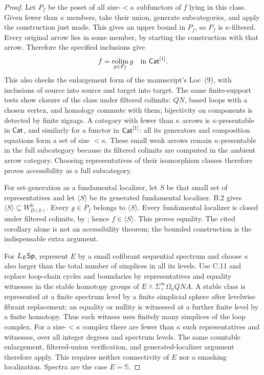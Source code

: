 \begin{proof}
Let $P_f$ be the poset of all size-$<\kappa$ subfunctors of $f$
lying in this class. Given fewer than $\kappa$ members, take their
union, generate subcategories, and apply the construction just
made. This gives an upper bound in $P_f$, so $P_f$ is
$\kappa$-filtered. Every original arrow lies in some member,
by starting the construction with that arrow. Therefore the
specified inclusions give
\[
 f=\operatorname*{colim}_{g\in P_f}g\quad\text{in }\mathsf{Cat}^{[1]}.
\]
This also checks the enlargement form of the manuscript's Loc~(9),
with inclusions of source into source and target into target.
The same finite-support tests show closure of the class under
filtered colimits: $QN$, based loops with a chosen vertex, and
homology commute with them; bijectivity on components is detected
by finite zigzags. A category with fewer than $\kappa$ arrows is
$\kappa$-presentable in $\mathsf{Cat}$, and similarly for a functor in
$\mathsf{Cat}^{[1]}$: all its generators and composition equations form
a set of size $<\kappa$. These small weak arrows remain
$\kappa$-presentable in the full subcategory because its filtered
colimits are computed in the ambient arrow category. Choosing
representatives of their isomorphism classes therefore proves
accessibility as a full subcategory.

For set-generation as a fundamental localizer, let $S$ be that
small set of representatives and let $\langle S\rangle$ be its
generated fundamental localizer. B.2 gives
$\langle S\rangle\subseteq W_{D(k)}^{\mathrm{lc}}$.
Every $g\in P_f$ belongs to $\langle S\rangle$. Every
fundamental localizer is closed under filtered colimits, by
\citet[Corollary~4.2.22]{Cisinski2006}; hence
$f\in\langle S\rangle$. This proves equality. The cited
corollary alone is not an accessibility theorem; the bounded
construction is the indispensable extra argument.

For $L_E\mathsf{Sp}$, represent $E$ by a small cofibrant sequential
spectrum and choose $\kappa$ also larger than the total number
of simplices in all its levels. Use C.11 and replace loop-chain
cycles and boundaries by representatives and equality witnesses
in the stable homotopy groups of
$E\wedge\Sigma^\infty_+\Omega_aQN A$. A stable class is
represented at a finite spectrum level by a finite simplicial
sphere after levelwise fibrant replacement; an equality or
nullity is witnessed at a further finite level by a finite
homotopy. Thus each witness uses finitely many simplices of
the loop complex. For a size-$<\kappa$ complex there are fewer
than $\kappa$ such representatives and witnesses, over all
integer degrees and spectrum levels. The same countable
enlargement, filtered-union verification, and generated-localizer
argument therefore apply. This requires neither connectivity
of $E$ nor a smashing localization. Spectra are the case
$E=\mathbb S$.


\end{proof}
